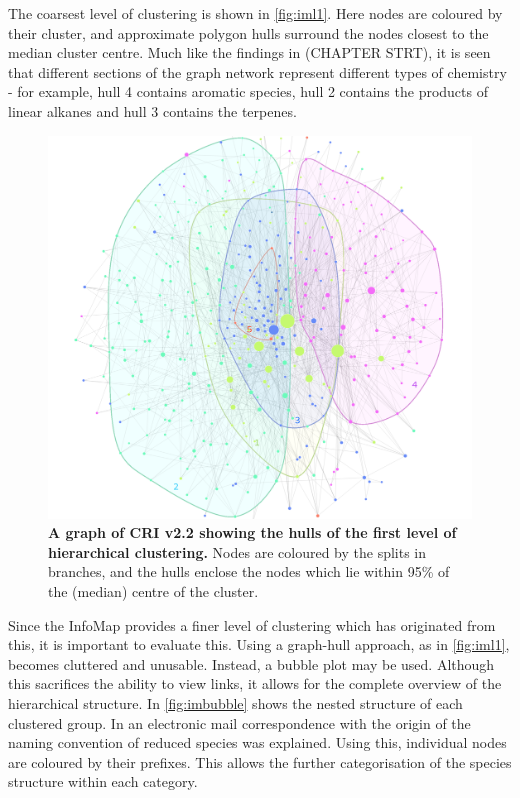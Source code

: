 The coarsest level of clustering is shown in \autoref{fig:iml1}. Here nodes are coloured by their cluster, and approximate polygon hulls surround the nodes closest to the median cluster centre. Much like the findings in (CHAPTER STRT), it is seen that different sections of the graph network represent different types of chemistry - for example, hull 4 contains aromatic species, hull 2 contains the products of linear alkanes and hull 3 contains the terpenes.


\begin{figure}[H]
  \centering
  \includegraphics[width=\textwidth]{fig/crigroups.png}
  \caption{\textbf{A graph of CRI v2.2 showing the hulls of the first level of hierarchical clustering.} Nodes are coloured by the splits in branches, and the hulls enclose the nodes which lie within 95\% of the (median) centre of the cluster.}
    \label{fig:iml1}
\end{figure}

Since the InfoMap provides a finer level of clustering which has originated from this, it is important to evaluate this. Using a graph-hull approach, as in \autoref{fig:iml1}, becomes cluttered and unusable. Instead, a bubble plot may be used. Although this sacrifices the ability to view links, it allows for the complete overview of the hierarchical structure. In \autoref{fig:imbubble} shows the nested structure of each clustered group. In an electronic mail correspondence with \cite{correspondance} the origin of the naming convention of reduced species was explained. Using this, individual nodes are coloured by their prefixes. This allows the further categorisation of the species structure within each category. 

